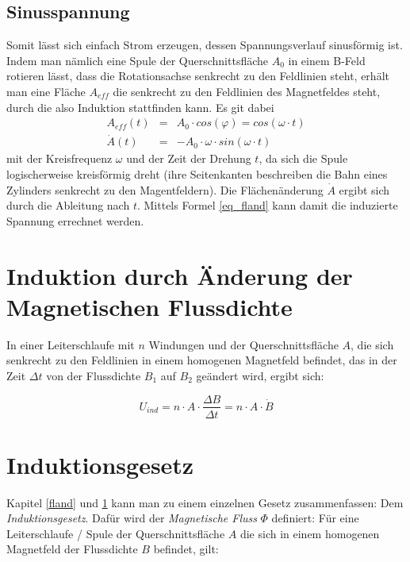 		\subsection{Sinusspannung}

Somit lässt sich einfach Strom erzeugen, dessen Spannungsverlauf sinusförmig ist. Indem man nämlich eine Spule der Querschnittsfläche \(A_0\) in einem B-Feld rotieren lässt, dass die Rotationsachse senkrecht zu den Feldlinien steht, erhält man eine Fläche \(A_{eff}\) die senkrecht zu den Feldlinien des Magnetfeldes steht, durch die also Induktion stattfinden kann. Es git dabei
\begin{eqnarray}
A_{eff}(t) &=& A_0 \cdot  cos(\varphi) = cos(\omega \cdot t) \\
\dot{A}(t) &=& - A_0 \cdot \omega \cdot sin(\omega \cdot t)
\end{eqnarray}
mit der Kreisfrequenz \(\omega\) und der Zeit der Drehung \(t\), da sich die Spule logischerweise kreisförmig dreht (ihre Seitenkanten beschreiben die Bahn eines Zylinders senkrecht zu den Magentfeldern). Die Flächenänderung \(\dot{A}\) ergibt sich durch die Ableitung nach \(t\). Mittels Formel \ref{eq_fland} kann damit die induzierte Spannung errechnet werden.



		\section{Induktion durch Änderung der Magnetischen Flussdichte}\label{dichland}

In einer Leiterschlaufe mit \(n\) Windungen und der Querschnittsfläche \(A\), die sich senkrecht zu den Feldlinien in einem homogenen Magnetfeld befindet, das in der Zeit \(\Delta t\) von der Flussdichte \(B_1\) auf \(B_2\) geändert wird, ergibt sich:

\begin{equation}
U_{ind} = n \cdot A \cdot \frac{\Delta B}{\Delta t} = n \cdot A \cdot \dot{B}
\label{eq_dichland}
\end{equation}

		\section{Induktionsgesetz}

Kapitel \ref{fland} und \ref{dichland} kann man zu einem einzelnen Gesetz zusammenfassen: Dem \textit{Induktionsgesetz}. Dafür wird der \textit{Magnetische Fluss} \(\Phi\) definiert: Für eine Leiterschlaufe / Spule der Querschnittsfläche \(A\) die sich in einem homogenen Magnetfeld der Flussdichte \(B\) befindet, gilt:

